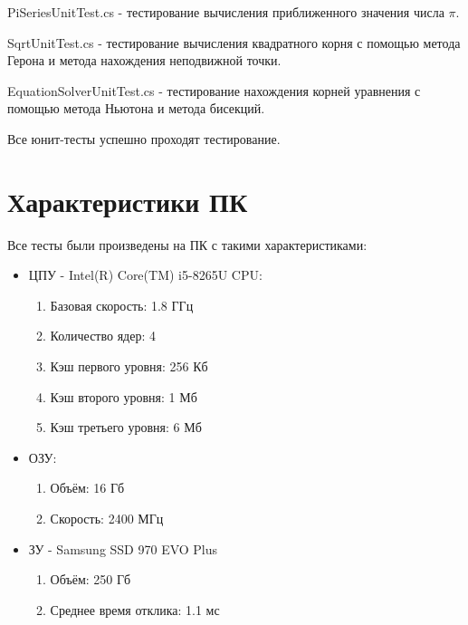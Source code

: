\begin{code}
	
	\caption{PiSeriesUnitTest.cs - тестирование вычисления приближенного значения числа $\pi$.}
\end{code}

\begin{code}
	
	\caption{SqrtUnitTest.cs - тестирование вычисления квадратного корня с помощью метода Герона и метода нахождения неподвижной точки.}
\end{code}

\begin{code}
	
	\caption{EquationSolverUnitTest.cs - тестирование нахождения корней уравнения с помощью метода Ньютона и метода бисекций.}
\end{code}

Все юнит-тесты успешно проходят тестирование.

\newpage
\section{Характеристики ПК}

Все тесты были произведены на ПК с такими характеристиками:

\begin{itemize}
	\item ЦПУ - Intel(R) Core(TM) i5-8265U CPU:
	\begin{enumerate}
		\item Базовая скорость: 1.8 ГГц
		\item Количество ядер: 4
		\item Кэш первого уровня: 256 Кб
		\item Кэш второго уровня: 1 Мб
		\item Кэш третьего уровня: 6 Мб
	\end{enumerate}
	\item ОЗУ:
	\begin{enumerate}
		\item Объём: 16 Гб
		\item Скорость: 2400 МГц
	\end{enumerate}
	\item ЗУ - Samsung SSD 970 EVO Plus
	\begin{enumerate}
		\item Объём: 250 Гб
		\item Среднее время отклика: 1.1 мс
	\end{enumerate}
\end{itemize}

